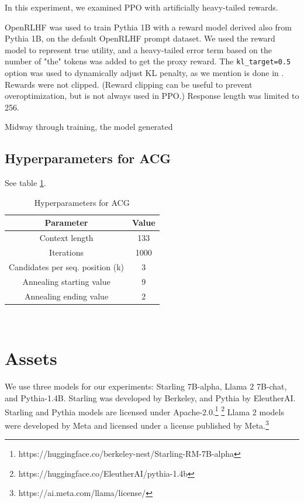 \documentclass{article}
\begin{document}
In this experiment, we examined PPO with artificially heavy-tailed rewards.

OpenRLHF \citep{hu2024openrlhf} was used to train Pythia 1B with a reward model derived also from Pythia 1B, on the default OpenRLHF prompt dataset.
We used the reward model to represent true utility, and a heavy-tailed error term based on the number of "the" tokens was added to get the proxy reward.
The \texttt{kl\_target=0.5} option was used to dynamically adjust KL penalty, as we mention is done in \citet{ziegler2020finetuning}.
Rewards were not clipped. (Reward clipping can be useful to prevent overoptimization, but is not always used in PPO.)
Response length was limited to 256.

Midway through training, the model generated 


\subsection{Hyperparameters for ACG}

See table \ref{tableh}.

\begin{table}
    \centering
    \label{tableh}
    \begin{tabular}{|c|c|}
        \hline
        Parameter & Value \\
        \hline
        Context length & 133 \\
        \hline
        Iterations & 1000 \\
        \hline
        Candidates per seq. position (k) & 3 \\
        \hline
        Annealing starting value & 9 \\
        \hline
        Annealing ending value & 2 \\
        \hline
    \end{tabular} \\
    \caption{Hyperparameters for ACG}
\end{table}

\section{Assets}

We use three models for our experiments: Starling 7B-alpha, Llama 2 7B-chat, and Pythia-1.4B. Starling was developed by Berkeley, and Pythia by EleutherAI. Starling and Pythia models are licensed under Apache-2.0.\footnote{https://huggingface.co/berkeley-nest/Starling-RM-7B-alpha} \footnote{https://huggingface.co/EleutherAI/pythia-1.4b} Llama 2 models were developed by Meta and licensed under a license published by Meta.\footnote{https://ai.meta.com/llama/license/} 
\end{document}
